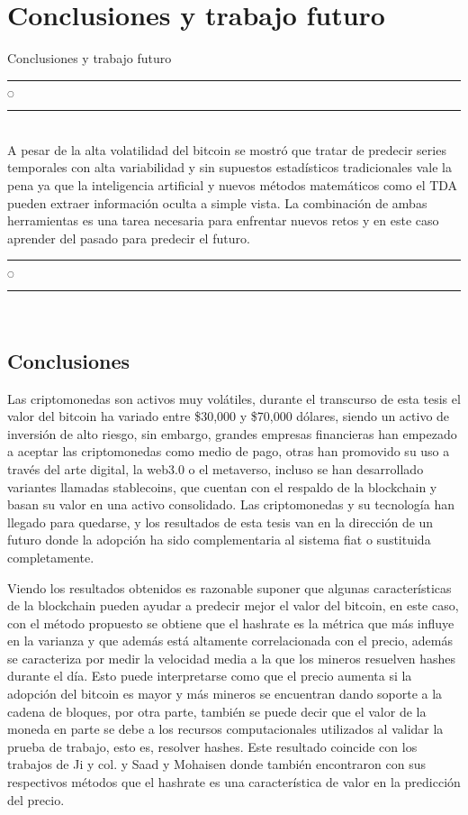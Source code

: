 \chapter[Conclusiones]{Conclusiones y trabajo futuro}{Conclusiones y trabajo futuro}\label{Conclusion}

\noindent
\rule{0.49\textwidth}{0.75pt} $_{\bigcirc}$ \rule{0.49\textwidth}{0.75pt}\\

A pesar de la alta volatilidad del bitcoin se mostró que tratar de predecir series temporales con alta variabilidad y sin supuestos estadísticos tradicionales vale la pena ya que la inteligencia artificial y nuevos métodos matemáticos como el TDA pueden extraer información oculta a simple vista. La combinación de ambas herramientas es una tarea necesaria para enfrentar nuevos retos y en este caso aprender del pasado para predecir el futuro.\\

\noindent
\rule{0.49\textwidth}{0.75pt} $_{\bigcirc}$ \rule{0.49\textwidth}{0.75pt}\\
\clearpage

\section{Conclusiones}


Las criptomonedas son activos muy volátiles, durante el transcurso de esta tesis el valor del bitcoin ha variado entre \$30,000 y \$70,000 dólares, siendo un activo de inversión de alto riesgo, sin embargo, grandes empresas financieras han empezado a aceptar las criptomonedas como medio de pago, otras han promovido su uso a través del arte digital, la web3.0 o el metaverso, incluso se han desarrollado variantes llamadas stablecoins, que cuentan con el respaldo de la blockchain y basan su valor en una activo consolidado. Las criptomonedas y su tecnología han llegado para quedarse, y los resultados de esta tesis van en la dirección de un futuro donde la adopción ha sido complementaria al sistema fiat o sustituida completamente.

Viendo los resultados obtenidos es razonable suponer que algunas características de la blockchain pueden ayudar a predecir mejor el valor del bitcoin, en este caso, con el método propuesto se obtiene que el hashrate es la métrica que más influye en la varianza y que además está altamente correlacionada con el precio, además se caracteriza por medir la velocidad media a la que los mineros resuelven hashes durante el día. Esto puede interpretarse como que el precio aumenta si la adopción del bitcoin es mayor y más mineros se encuentran dando soporte a la cadena de bloques, por otra parte, también se puede decir que el valor de la moneda en parte se debe a los recursos computacionales utilizados al validar la prueba de trabajo, esto es, resolver hashes. Este resultado coincide con los trabajos de Ji y col. \parencite*{jiBestFeatureSelection2019} y Saad y Mohaisen \parencite*{saadCharacterizingBlockchainbasedCryptocurrencies2018} donde también encontraron con sus respectivos métodos que el hashrate es una característica de valor en la predicción del precio. 

